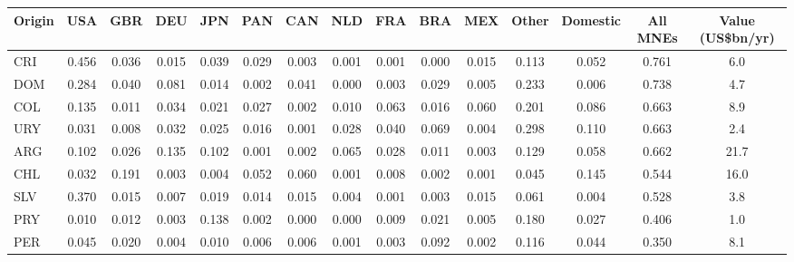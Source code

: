 \begin{tabular}{lcccccccccccccc}
\toprule
Origin & USA & GBR & DEU & JPN & PAN & CAN & NLD & FRA & BRA & MEX & Other & Domestic & All MNEs & Value (US\$bn/yr) \\
\midrule
CRI & 0.456 & 0.036 & 0.015 & 0.039 & 0.029 & 0.003 & 0.001 & 0.001 & 0.000 & 0.015 & 0.113 & 0.052 & 0.761 & 6.0 \\
DOM & 0.284 & 0.040 & 0.081 & 0.014 & 0.002 & 0.041 & 0.000 & 0.003 & 0.029 & 0.005 & 0.233 & 0.006 & 0.738 & 4.7 \\
COL & 0.135 & 0.011 & 0.034 & 0.021 & 0.027 & 0.002 & 0.010 & 0.063 & 0.016 & 0.060 & 0.201 & 0.086 & 0.663 & 8.9 \\
URY & 0.031 & 0.008 & 0.032 & 0.025 & 0.016 & 0.001 & 0.028 & 0.040 & 0.069 & 0.004 & 0.298 & 0.110 & 0.663 & 2.4 \\
ARG & 0.102 & 0.026 & 0.135 & 0.102 & 0.001 & 0.002 & 0.065 & 0.028 & 0.011 & 0.003 & 0.129 & 0.058 & 0.662 & 21.7 \\
CHL & 0.032 & 0.191 & 0.003 & 0.004 & 0.052 & 0.060 & 0.001 & 0.008 & 0.002 & 0.001 & 0.045 & 0.145 & 0.544 & 16.0 \\
SLV & 0.370 & 0.015 & 0.007 & 0.019 & 0.014 & 0.015 & 0.004 & 0.001 & 0.003 & 0.015 & 0.061 & 0.004 & 0.528 & 3.8 \\
PRY & 0.010 & 0.012 & 0.003 & 0.138 & 0.002 & 0.000 & 0.000 & 0.009 & 0.021 & 0.005 & 0.180 & 0.027 & 0.406 & 1.0 \\
PER & 0.045 & 0.020 & 0.004 & 0.010 & 0.006 & 0.006 & 0.001 & 0.003 & 0.092 & 0.002 & 0.116 & 0.044 & 0.350 & 8.1 \\
\bottomrule
\end{tabular}
